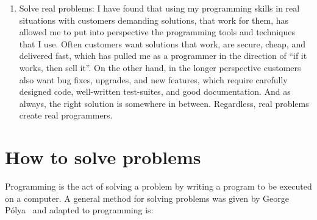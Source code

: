 \begin{enumerate}
\item Solve real problems: I have found that using my programming skills in real situations with customers demanding solutions, that work for them, has allowed me to put into perspective the programming tools and techniques that I use. Often customers want solutions that work, are secure, cheap, and delivered fast, which has pulled me as a programmer in the direction of ``if it works, then sell it''. On the other hand, in the longer perspective customers also want bug fixes, upgrades, and new features, which require carefully designed code, well-written test-suites, and good documentation. And as always, the right solution is somewhere in between. Regardless, real problems create real programmers.
\end{enumerate}

\section{How to solve problems}
Programming is the act of solving a problem by writing a program to be executed on a computer. A general method for solving problems was given by George Pólya~\cite{polya45} and adapted to programming is:
